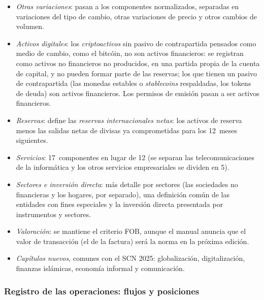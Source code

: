 \documentclass[11pt]{article}
\begin{document}
\begin{anotaciones}
\begin{itemize}
\begin{itemize}
  \item \emph{Otras variaciones}: pasan a los componentes normalizados, separadas en variaciones del tipo de cambio, otras variaciones de precio y otros cambios de volumen.
  \item \emph{Activos digitales}: los \emph{criptoactivos} sin pasivo de contrapartida pensados como medio de cambio, como el bitcóin, no son activos financieros: se registran como activos no financieros no producidos, en una partida propia de la cuenta de capital, y no pueden formar parte de las reservas; los que tienen un pasivo de contrapartida (las monedas estables o \emph{stablecoins} respaldadas, los tokens de deuda) son activos financieros. Los permisos de emisión pasan a ser activos financieros.
  \item \emph{Reservas}: define las \emph{reservas internacionales netas}: los activos de reserva menos las salidas netas de divisas ya comprometidas para los 12~meses siguientes.
  \item \emph{Servicios}: 17~componentes en lugar de 12 (se separan las telecomunicaciones de la informática y los otros servicios empresariales se dividen en 5).
  \item \emph{Sectores e inversión directa}: más detalle por sectores (las sociedades no financieras y los hogares, por separado), una definición común de las entidades con fines especiales y la inversión directa presentada por instrumentos y sectores.
  \item \emph{Valoración}: se mantiene el criterio FOB, aunque el manual anuncia que el valor de transacción (el de la factura) será la norma en la próxima edición.
  \item \emph{Capítulos nuevos}, comunes con el SCN 2025: globalización, digitalización, finanzas islámicas, economía informal y comunicación\nocite{FMI2025BPM7}.
  \end{itemize}
\end{itemize}
\end{anotaciones}

\subsubsection{Registro de las operaciones: flujos y posiciones}\label{sec:flujos-posiciones}
\end{document}
